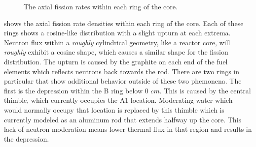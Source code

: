 \begin{figure}[htb]
\caption[Axial Fission Rates]{The axial fission rates within each ring of the core.}
\label{fig:axial_rr_density}
\end{figure}

\clearpage

 shows the axial fission rate densities within each ring of the core.
Each of these rings shows a cosine-like distribution with a slight upturn at each extrema.
Neutron flux within a {\it roughly} cylindrical geometry, like a reactor core, will {\it roughly} exhibit a cosine shape, which causes a similar shape for the fission distribution.
The upturn is caused by the graphite on each end of the fuel elements which reflects neutrons back towards the rod.
There are two rings in particular that show additional behavior outside of these two phemonena.
The first is the depression within the B ring below 0 $cm$.
This is caused by the central thimble, which currently occupies the A1 location.
Moderating water which would normally occupy that location is replaced by this thimble which is currently modeled as an aluminum rod that extends halfway up the core.
This lack of neutron moderation means lower thermal flux in that region and results in the depression.

